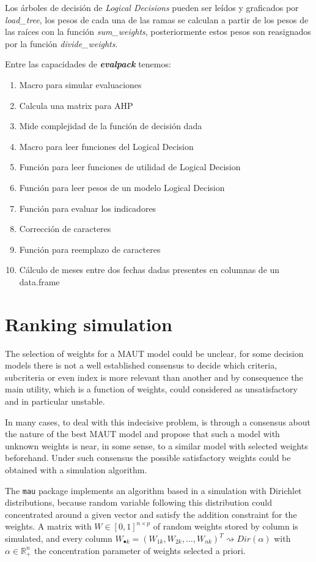 Los árboles de decisión de {\it Logical Decisions\textregistered } pueden ser leídos y graficados
por {\it load\_tree}, los pesos de cada una de las ramas se calculan a partir de los pesos de las
raíces con la función {\it sum\_weights}, posteriormente estos pesos son reasignados por la función
{\it divide\_weights}.     

Entre las capacidades de \textit{\textbf{evalpack}} tenemos:
\begin{enumerate}
\item Macro para simular evaluaciones
\item Calcula una matrix para AHP
\item Mide complejidad de la función de decisión dada
\item Macro para leer funciones del Logical Decision
\item Función para leer funciones de utilidad de Logical Decision
\item Función para leer pesos de un modelo Logical Decision
\item Función para evaluar los indicadores
\item Corrección de caracteres 
\item Función para reemplazo de caracteres
\item Cálculo de meses entre dos fechas dadas presentes en columnas de un data.frame
\end{enumerate}


\section{Ranking simulation}
The selection of weights for a MAUT model could be unclear, for some decision models there is not a 
well established consensus to decide which criteria, subcriteria or even index is more 
relevant than another and by consequence the main utility, which is a function of weights, could 
considered as unsatisfactory and in particular unstable.

In many cases, to deal with this indecisive problem, is through a consensus about the nature of 
the best MAUT model and propose that such a model with unknown weights is near, in some sense, to 
a similar model with selected weights beforehand. Under such consensus the possible satisfactory 
weights could be obtained with a simulation algorithm.

The \texttt{mau} package implements an algorithm based in a simulation with Dirichlet distributions,
because random variable following this distribution could concentrated around a given vector and 
satisfy the addition constraint for the weights. A matrix with $W\in[0,1]^{n\times p}$ of random 
weights stored by column is simulated, and every column 
$W_{\bullet k} = (W_{1k},W_{2k},\ldots,W_{nk})^T\rightsquigarrow Dir(\alpha)$
with $\alpha\in \mathbb{R}_+^n$ the concentration parameter of weights selected a priori.

